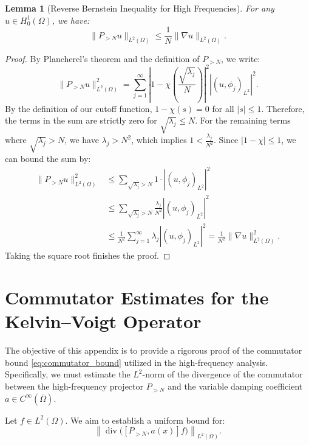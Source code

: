 \documentclass[11pt,letterpaper]{amsart}
\newtheorem{lemma}[theorem]{Lemma}
\begin{document}
\begin{lemma}[Reverse Bernstein Inequality for High Frequencies]\label{lem:bernstein_high}
For any $u \in H^1_0(\Omega)$, we have:
\begin{equation}
    \|P_{> N} u\|_{L^2(\Omega)} \le \frac{1}{N} \|\nabla u\|_{L^2(\Omega)}.
\end{equation}
\end{lemma}
\begin{proof}
By Plancherel's theorem and the definition of $P_{>N}$, we write:
\begin{equation*}
    \|P_{> N} u\|_{L^2(\Omega)}^2 = \sum_{j=1}^\infty \left| 1 - \chi\left(\frac{\sqrt{\lambda_j}}{N}\right) \right|^2 |(u, \phi_j)_{L^2}|^2.
\end{equation*}
By the definition of our cutoff function, $1 - \chi(s) = 0$ for all $|s| \le 1$. Therefore, the terms in the sum are strictly zero for $\sqrt{\lambda_j} \le N$. For the remaining terms where $\sqrt{\lambda_j} > N$, we have $\lambda_j > N^2$, which implies $1 < \frac{\lambda_j}{N^2}$. Since $|1 - \chi| \le 1$, we can bound the sum by:
\begin{align*}
    \|P_{> N} u\|_{L^2(\Omega)}^2 &\le \sum_{\sqrt{\lambda_j} > N} 1 \cdot |(u, \phi_j)_{L^2}|^2 \\
    &\le \sum_{\sqrt{\lambda_j} > N} \frac{\lambda_j}{N^2} |(u, \phi_j)_{L^2}|^2 \\
    &\le \frac{1}{N^2} \sum_{j=1}^\infty \lambda_j |(u, \phi_j)_{L^2}|^2 = \frac{1}{N^2} \|\nabla u\|_{L^2(\Omega)}^2.
\end{align*}
Taking the square root finishes the proof.
\end{proof}


\section{Commutator Estimates for the Kelvin–Voigt Operator} \label{sec:appendix_commutator}

The objective of this appendix is to provide a rigorous proof of the commutator bound \eqref{eq:commutator_bound} utilized in the high-frequency analysis. Specifically, we must estimate the $L^2$-norm of the divergence of the commutator between the high-frequency projector $P_{>N}$ and the variable damping coefficient $a \in C^{\infty}(\overline{\Omega})$.

Let $f \in L^2(\Omega)$. We aim to establish a uniform bound for:
\begin{equation*}
    \left\| \operatorname{div} \Big( [P_{>N}, a(x)] f \Big) \right\|_{L^2(\Omega)}.
\end{equation*}
\end{document}
